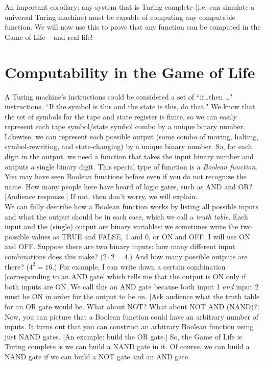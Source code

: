 \documentclass{article}
\begin{document}
An important corollary: any system that is Turing complete (i.e. can simulate a universal Turing machine) must be capable of computing any computable function. We will now use this to prove that any function can be computed in the Game of Life -- and real life!

\section*{Computability in the Game of Life}
A Turing machine's instructions could be considered a set of ``if\ldots then \ldots" instructions. ``If the symbol is this and the state is this, do that." We know that the set of symbols for the tape and state register is finite, so we can easily represent each tape symbol/state symbol combo by a unique binary number. Likewise, we can represent each possible output (some combo of moving, halting, symbol-rewriting, and state-changing) by a unique binary number. So, for each digit in the output, we need a function that takes the input binary number and outputs a single binary digit. This special type of function is a \textit{Boolean function}.\\

You may have seen Boolean functions before even if you do not recognize the name. How many people here have heard of logic gates, such as AND and OR? [Audience response.] If not, then don't worry, we will explain.\\

We can fully describe how a Boolean function works by listing all possible inputs and what the output should be in each case, which we call a \textit{truth table}. Each input and the (single) output are binary variables: we sometimes write the two possible values as TRUE and FALSE, 1 and 0, or ON and OFF. I will use ON and OFF. Suppose there are two binary inputs: how many different input combinations does this make? ($2\cdot 2=4$.) And how many possible outputs are there? ($4^2 = 16$.) For example, I can write down a certain combination [corresponding to an AND gate] which tells me that the output is ON only if both inputs are ON. We call this an AND gate because both input 1 \textit{and} input 2 must be ON in order for the output to be on. [Ask audience what the truth table for an OR gate would be. What about NOT? What about NOT AND (NAND)?]\\

Now, you can picture that a Boolean function could have an arbitrary number of inputs. It turns out that you can construct an arbitrary Boolean function using just NAND gates. [An example: build the OR gate.] So, the Game of Life is Turing complete is we can build a NAND gate in it. Of course, we can build a NAND gate if we can build a NOT gate and an AND gate.\\
\end{document}
